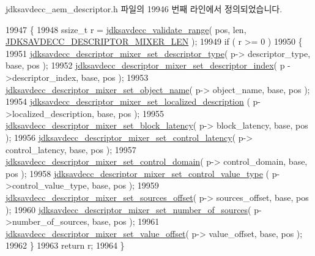 jdksavdecc\+\_\+aem\+\_\+descriptor.\+h 파일의 19946 번째 라인에서 정의되었습니다.


\begin{DoxyCode}
19947 \{
19948     ssize\_t r = \hyperlink{group__util_ga9c02bdfe76c69163647c3196db7a73a1}{jdksavdecc\_validate\_range}( pos, len, 
      \hyperlink{group__descriptor__mixer_ga54e31d2393566efeee213c24cb777130}{JDKSAVDECC\_DESCRIPTOR\_MIXER\_LEN} );
19949     \textcolor{keywordflow}{if} ( r >= 0 )
19950     \{
19951         \hyperlink{group__descriptor__mixer_ga619e4732867736aac6ea6f4c536355ca}{jdksavdecc\_descriptor\_mixer\_set\_descriptor\_type}( p->
      descriptor\_type, base, pos );
19952         \hyperlink{group__descriptor__mixer_gac1b0547c5bdd1750428190db2d96ab30}{jdksavdecc\_descriptor\_mixer\_set\_descriptor\_index}( p
      ->descriptor\_index, base, pos );
19953         \hyperlink{group__descriptor__mixer_gaf741a5d83ddbe3a7828272aa6bc94093}{jdksavdecc\_descriptor\_mixer\_set\_object\_name}( p->
      object\_name, base, pos );
19954         \hyperlink{group__descriptor__mixer_gae1361e1b7194cde00a440257c1cf6356}{jdksavdecc\_descriptor\_mixer\_set\_localized\_description}
      ( p->localized\_description, base, pos );
19955         \hyperlink{group__descriptor__mixer_ga27b42d3b9fd5f0a5af3694b91c2f01a4}{jdksavdecc\_descriptor\_mixer\_set\_block\_latency}( p->
      block\_latency, base, pos );
19956         \hyperlink{group__descriptor__mixer_ga3ff852117feb062022cff7c3f86718e6}{jdksavdecc\_descriptor\_mixer\_set\_control\_latency}( p->
      control\_latency, base, pos );
19957         \hyperlink{group__descriptor__mixer_ga8e53538f8d09c11d0dab47f1cbc3e6a5}{jdksavdecc\_descriptor\_mixer\_set\_control\_domain}( p->
      control\_domain, base, pos );
19958         \hyperlink{group__descriptor__mixer_ga771f98126a9ce6bc1258b4e539771873}{jdksavdecc\_descriptor\_mixer\_set\_control\_value\_type}
      ( p->control\_value\_type, base, pos );
19959         \hyperlink{group__descriptor__mixer_ga815f391c6bc2ec5a36c84de133d1a137}{jdksavdecc\_descriptor\_mixer\_set\_sources\_offset}( p->
      sources\_offset, base, pos );
19960         \hyperlink{group__descriptor__mixer_gaef4df92f98accfd60cb29831e57f62fe}{jdksavdecc\_descriptor\_mixer\_set\_number\_of\_sources}(
       p->number\_of\_sources, base, pos );
19961         \hyperlink{group__descriptor__mixer_gab8020717ad4aeeca114e872a16891725}{jdksavdecc\_descriptor\_mixer\_set\_value\_offset}( p->
      value\_offset, base, pos );
19962     \}
19963     \textcolor{keywordflow}{return} r;
19964 \}
\end{DoxyCode}


